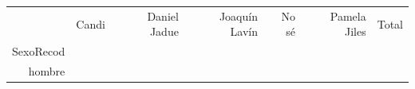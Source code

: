 \documentclass[
]{article}
\begin{document}
\begin{longtable}[]{@{}rrrrrrr@{}}
\toprule
\endhead
\begin{minipage}[t]{0.09\columnwidth}\raggedleft
\strut
\end{minipage} & \begin{minipage}[t]{0.06\columnwidth}\raggedleft
Candi\strut
\end{minipage} & \begin{minipage}[t]{0.13\columnwidth}\raggedleft
Daniel Jadue\strut
\end{minipage} & \begin{minipage}[t]{0.12\columnwidth}\raggedleft
Joaquín Lavín\strut
\end{minipage} & \begin{minipage}[t]{0.13\columnwidth}\raggedleft
No sé\strut
\end{minipage} & \begin{minipage}[t]{0.13\columnwidth}\raggedleft
Pamela Jiles\strut
\end{minipage} & \begin{minipage}[t]{0.13\columnwidth}\raggedleft
Total\strut
\end{minipage}\tabularnewline
\begin{minipage}[t]{0.09\columnwidth}\raggedleft
SexoRecod\strut
\end{minipage} & \begin{minipage}[t]{0.06\columnwidth}\raggedleft
\strut
\end{minipage} & \begin{minipage}[t]{0.13\columnwidth}\raggedleft
\strut
\end{minipage} & \begin{minipage}[t]{0.12\columnwidth}\raggedleft
\strut
\end{minipage} & \begin{minipage}[t]{0.13\columnwidth}\raggedleft
\strut
\end{minipage} & \begin{minipage}[t]{0.13\columnwidth}\raggedleft
\strut
\end{minipage} & \begin{minipage}[t]{0.13\columnwidth}\raggedleft
\strut
\end{minipage}\tabularnewline
\begin{minipage}[t]{0.09\columnwidth}\raggedleft
hombre\strut
\end{minipage} & \begin{minipage}[t]{0.06\columnwidth}\raggedleft
\strut
\end{minipage} & \begin{minipage}[t]{0.13\columnwidth}\raggedleft

\end{minipage}
\end{longtable}
\end{document}
